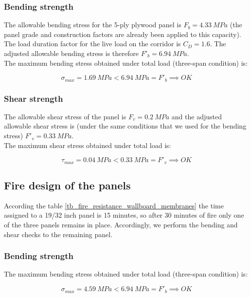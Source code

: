 \documentclass[a4paper,11pt]{xc_memo}
\begin{document}
\subsubsection{Bending strength}
The allowable bending stress for the 5-ply plywood panel is $F_b= 4.33\ MPa$ (the panel grade and construction factors are already been applied to this capacity). The load duration factor for the live load on the corridor is $C_D= 1.6$. The adjusted allowable bending stress is therefore $F'_b= 6.94\ MPa$.\\

The maximum bending stress obtained under total load (three-span condition) is:

\begin{equation}
  \sigma_{max}= 1.69\ MPa < 6.94\ MPa = F'_b \implies OK
\end{equation}


\subsubsection{Shear strength}
The allowable shear stress of the panel is $F_v= 0.2\ MPa$ and the adjusted allowable shear stress is (under the same conditions that we used for the bending stress) $F'_v= 0.33\ MPa$.\\

The maximum shear stress obtained under total load is:

\begin{equation}
  \tau_{max}= 0.04\ MPa < 0.33\ MPa = F'_v \implies OK
\end{equation}

\subsection{Fire design of the panels}
According the table \ref{tb_fire_resistance_wallboard_membranes} the time assigned to a 19/32 inch panel is 15 minutes, so after 30 minutes of fire only one of the three panels remains in place. Accordingly, we perform the bending and shear checks to the remaining panel.

\subsubsection{Bending strength}
The maximum bending stress obtained under total load (three-span condition) is:

\begin{equation}
  \sigma_{max}= 4.59\ MPa < 6.94\ MPa = F'_b \implies OK
\end{equation}
\end{document}
